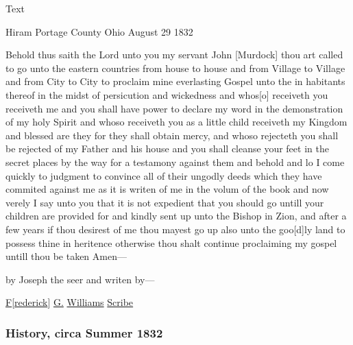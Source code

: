 			
			\begin{description}
				\item[Text]
			\end{description}
			
				Hiram Portage County Ohio August 29 1832
				
				Behold thus saith the Lord unto you my servant John [Murdock] thou art called to go unto the eastern countries from house to house and from Village to Village and from City to City to proclaim mine everlasting Gospel unto the in habitants thereof in the midst of persicution and wickedness and whos[o] receiveth you receiveth me and you shall have power to declare my word in the demonstration of my holy Spirit and whoso receiveth you as a little child receiveth my Kingdom and blessed are they for they shall obtain mercy, and whoso rejecteth you shall be rejected of my Father and his house and you shall cleanse your feet in the secret places by the way for a testamony against them and behold and lo I come quickly to judgment to convince all of their ungodly deeds which they have commited against me as it is writen of me in the volum of the book and now verely I say unto you that it is not expedient that you should go untill your children are provided for and kindly sent up unto the Bishop in Zion, and after a few years if thou desirest of me thou mayest go up also unto the goo[d]ly land to possess thine in heritence otherwise thou shalt continue proclaiming my gospel untill thou be taken Amen---
				
				by Joseph the seer and writen by---
				
				\uline{F}[\uline{rederick}] \uline{G.} \uline{Williams} \uline{Scribe}
				
		\subsubsection{History, circa Summer 1832}
			\label{EMS-1832-JS-CIR-SUM-1832}
		
